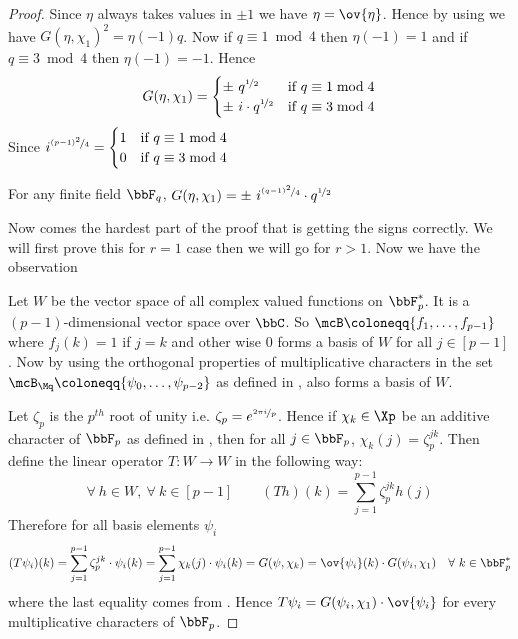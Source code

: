 \begin{proof}
  Since $\eta$ always takes values in $\pm 1$ we have $\eta=\ov{\eta}$. Hence by using  we have $G(\eta,\chi_1)^2=\eta(-1)q$. Now if $q\equiv 1\bmod 4$ then $\eta(-1)=1$ and if $q\equiv 3\bmod 4$ then $\eta(-1)=-1$. Hence \begin{equation}
    G(\eta,\chi_1)=\begin{cases}
      \pm\ q^{\nicefrac12}& \text{if }q\equiv 1\bmod 4\\ 
      \pm\ i\cdot q^{\nicefrac12}& \text{if }q\equiv 3\bmod 4
    \end{cases}
  \end{equation}
  Since $i^{\nicefrac{(p-1)^2}{4}}=\begin{cases}
      1 & \text{if }q\equiv 1\bmod 4\\ 0 & \text{if }q\equiv 3\bmod 4
    \end{cases}$

  \begin{observation}\label{obs:gauss-quad-char}
    For any finite field $\bbF_q$,  $G(\eta,\chi_1)=\pm\ i^{\nicefrac{(q-1)^2}{4}}\cdot q^{\nicefrac12}$ 
  \end{observation}

  Now comes the hardest part of the proof that is getting the signs correctly. We will first prove this for $r=1$ case then we will go for $r>1$. Now we have the observation
  
  
  Let $W$ be the vector space of all complex valued functions on $\bbF_p^*$. It is a $(p-1)$-dimensional vector space over $\bbC$. So $\mcB\coloneqq \{f_1,\dots, f_{p-1}\}$ where $f_j(k)=1$ if $j=k$ and other wise $0$ forms a basis of $W$ for all $j\in[p-1]$. Now by using the orthogonal properties of multiplicative characters in  the set $\mcB_{\Mq}\coloneqq \{\psi_0,\dots, \psi_{p-2}\}$ as defined in , also forms a basis of $W$.

  Let $\zeta_p$ is the $p^{th}$ root of unity i.e. $\zeta_p=e^{\nicefrac{2\pi i}{p}}$. Hence if $\chi_k\in\Xp$ be an additive character of $\bbF_p$ as defined in , then for all $j\in\bbF_p$, $\chi_k(j)=\zeta_p^{jk}$. Then define the linear operator $T:W\to W$ in the following way:
  \begin{equation}\label{eq:quad-linear-operator}
    \forall\ h\in W,\ \forall\ k\in[p-1]\qquad (Th)(k)=\sum_{j=1}^{p-1}\zeta_p^{jk}h(j)
  \end{equation}
  Therefore for all basis elements $\psi_i$ $$(T\psi_i)(k)=\sum_{j=1}^{p-1}\zeta_p^{jk}\cdot \psi_i(k)=\sum_{j=1}^{p-1}\chi_k(j)\cdot \psi_i(k)=G(\psi,\chi_k)=\ov{\psi_i}(k)\cdot G(\psi_i,\chi_1)\quad \forall\ k\in\bbF_p^*$$where the last equality comes from . Hence $T\psi_i=G(\psi_i,\chi_1)\cdot \ov{\psi_i}$ for every multiplicative characters of $\bbF_p$. 


\end{proof}
